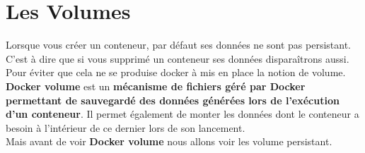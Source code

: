 \documentclass[12pt,a4paper]{article}
\begin{document}
\section{Les Volumes}
Lorsque vous créer un conteneur, par défaut ses données ne sont pas
persistant. C'est à dire que si vous supprimé un conteneur ses
données disparaîtrons aussi. Pour éviter que cela ne se produise
docker à mis en place la notion de volume.\\
\textbf{Docker volume} est un \textbf{mécanisme de fichiers géré
par Docker permettant de sauvegardé des données générées lors de 
l'exécution d'un conteneur}. Il permet également de monter les données dont le conteneur a besoin à l'intérieur de ce dernier lors
de son lancement.\\
Mais avant de voir \textbf{Docker volume} nous allons voir les
volume persistant.
\end{document}
